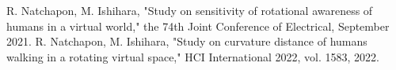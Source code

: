 \label{ap:research_list}



%

	\begin{enumerate}
 R. Natchapon, M. Ishihara, "Study on sensitivity of rotational awareness of humans in a virtual world," the 74th Joint Conference of Electrical, September 2021.
 R. Natchapon, M. Ishihara, "Study on curvature distance of humans walking in a rotating virtual space," HCI International 2022, vol. 1583, 2022.
	\end{enumerate}
	
	
